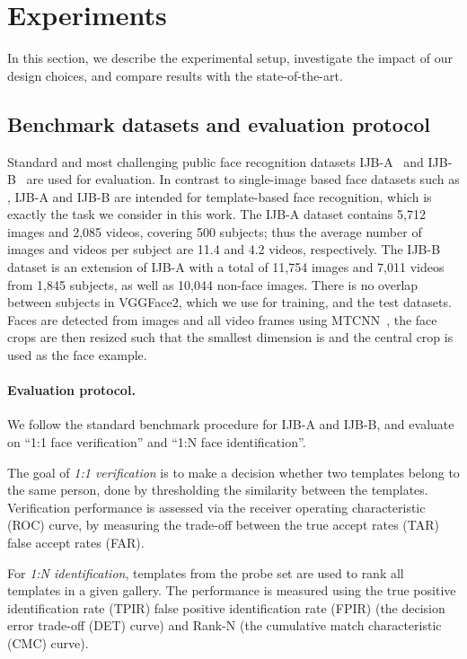 \documentclass[runningheads]{llncs}
\begin{document}
\section{Experiments}
\label{sec:exp}
In this section, we describe the experimental setup,
investigate the impact of our design choices,
and compare results with the state-of-the-art.


\subsection{Benchmark datasets and evaluation protocol}
Standard and most challenging public face recognition datasets
IJB-A~\cite{Klare15} and IJB-B~\cite{Whitelam17}
are used for evaluation.
In contrast to single-image based face datasets such as
\cite{Parkhi15,Guo16,Kemelmacher16,Cao18},
IJB-A and IJB-B are intended for template-based face recognition,
which is exactly the task we consider in this work.
The IJB-A dataset contains 5,712 images 
and 2,085 videos, covering 500 subjects; thus the
average number of images and videos per subject
are 11.4 and 4.2 videos, respectively.
The IJB-B dataset is an extension of IJB-A
with a total of 11,754 images and
7,011 videos
from 1,845 subjects, as well as 
10,044 non-face images.
There is no overlap between subjects in VGGFace2, which we use
for training, and the test datasets.
Faces are detected from images and all video frames
using MTCNN~\cite{Zhang16},
the face crops are then resized such that the smallest 
dimension is  and the central  crop is
used as the face example.


\paragraph{Evaluation protocol.}
We follow the standard benchmark procedure for
IJB-A and IJB-B, and evaluate on
``1:1 face verification'' and ``1:N face identification''.

The goal of \emph{1:1 verification} is to make a decision
whether two templates belong to the same person,
done by thresholding the similarity between the templates.
Verification performance is assessed via the
receiver operating characteristic (ROC) curve,
\ie by measuring the trade-off between the
true accept rates (TAR) \vs false accept 
rates (FAR).

For \emph{1:N identification},
templates from the probe set are used to rank
all templates in a given gallery. 
The performance is 
measured using the true positive identification 
rate (TPIR) \vs false positive identification 
rate (FPIR) (\ie the decision error trade-off (DET) curve)
and \vs Rank-N (\ie the cumulative match characteristic 
(CMC) curve).
\end{document}

